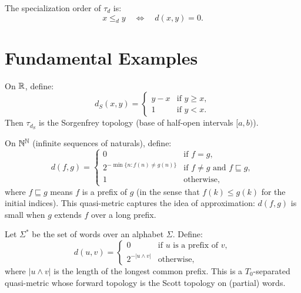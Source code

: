 \begin{definition}
The specialization order of $\tau_d$ is:
\[
  x \leq_d y \quad \Longleftrightarrow \quad d(x,y) = 0.
\]
\end{definition}

\section{Fundamental Examples}

\begin{example}
On $\mathbb{R}$, define:
\[
  d_S(x,y) = \begin{cases} y - x & \text{if } y \geq x, \\ 1 & \text{if } y < x.
  \end{cases}
\]
Then $\tau_{d_S}$ is the Sorgenfrey topology (base of half-open intervals $[a,b)$).
\end{example}

\begin{example}
On $\mathbb{N}^{\mathbb{N}}$ (infinite sequences of naturals), define:
\[
  d(f,g) = \begin{cases} 0 & \text{if } f = g, \\
  2^{-\min\{n : f(n) \neq g(n)\}} & \text{if } f \neq g \text{ and } f \sqsubseteq g, \\
  1 & \text{otherwise,} \end{cases}
\]
where $f \sqsubseteq g$ means $f$ is a prefix of $g$ (in the sense that $f(k) \leq g(k)$
for the initial indices). This quasi-metric captures the idea of approximation: $d(f,g)$ is
small when $g$ extends $f$ over a long prefix.
\end{example}

\begin{example}
Let $\Sigma^*$ be the set of words over an alphabet $\Sigma$. Define:
\[
  d(u,v) = \begin{cases} 0 & \text{if } u \text{ is a prefix of } v, \\
  2^{-|u \wedge v|} & \text{otherwise,} \end{cases}
\]
where $|u \wedge v|$ is the length of the longest common prefix. This is a $T_0$-separated
quasi-metric whose forward topology is the Scott topology on (partial) words.
\end{example}

